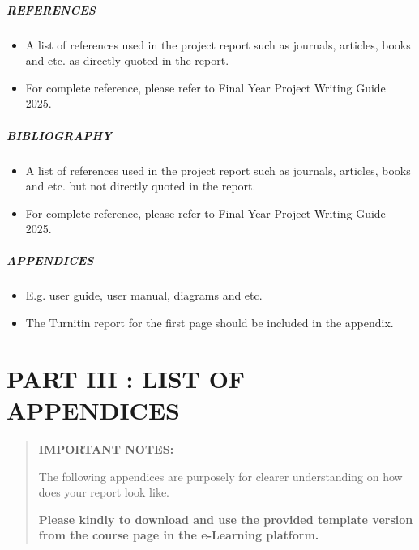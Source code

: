 \subparagraph{REFERENCES}\label{references}

\begin{itemize}
\item
  A list of references used in the project report such as journals,
  articles, books and etc. as directly quoted in the report.
\item
  For complete reference, please refer to Final Year Project Writing
  Guide 2025.
\end{itemize}

\subparagraph{BIBLIOGRAPHY}\label{bibliography}

\begin{itemize}
\item
  A list of references used in the project report such as journals,
  articles, books and etc. but not directly quoted in the report.
\item
  For complete reference, please refer to Final Year Project Writing
  Guide 2025.
\end{itemize}

\subparagraph{APPENDICES}\label{appendices}

\begin{itemize}
\item
  E.g. user guide, user manual, diagrams and etc.
\item
  The Turnitin report for the first page should be included in the
  appendix.
\end{itemize}

\section{PART III : LIST OF
APPENDICES}\label{part-iii-list-of-appendices}

\begin{quote}
\textbf{IMPORTANT NOTES:}

The following appendices are purposely for clearer understanding on how
does your report look like.

\textbf{Please kindly to download and use the provided template version
from the course page in the e-Learning platform.}
\end{quote}
